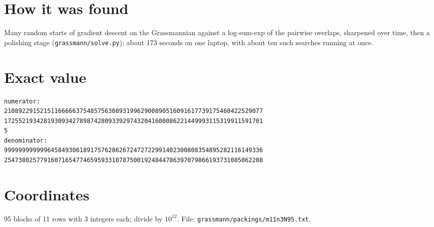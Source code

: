 \documentclass[11pt,a4paper]{article}
\begin{document}
\section{How it was found}
Many random starts of gradient descent on the Grassmannian against a log-sum-exp of the pairwise overlaps, sharpened over time, then a polishing stage (\texttt{grassmann/solve.py}); about 173 seconds on one laptop, with about ten such searches running at once.


\appendix
\section{Exact value}
{\small
\begin{verbatim}
numerator:
210892291521511666663754857563089319962900890516091617739175460422529077
172552193428193093427898742809339297432041600086221449993115319911591701
5
denominator:
999999999999645849306189175762862672472722991402300808354895282116149336
254738025779160716547746595933107875001924844786397079866193731085062208
\end{verbatim}}

\section{Coordinates}
95 blocks of 11 rows with 3 integers each; divide by $10^{12}$. File: \texttt{grassmann/packings/m11n3N95.txt}.
{\tiny
\begin{multicols}{3}
\end{multicols}}
\end{document}
